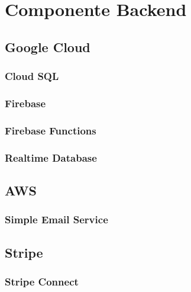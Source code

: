 \section{Componente Backend}
\subsection{Google Cloud}
\subsubsection{Cloud SQL}
\subsubsection{Firebase}
\subsubsection{Firebase Functions}
\subsubsection{Realtime Database}
\subsection{AWS}
\subsubsection{Simple Email Service}
\subsection{Stripe}
\subsubsection{Stripe Connect}